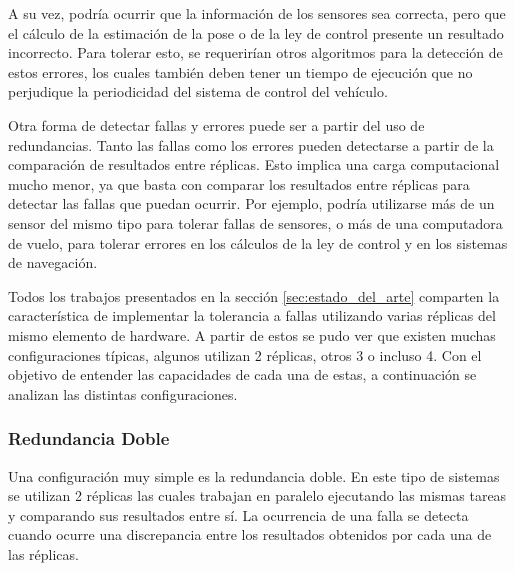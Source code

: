 A su vez, podría ocurrir que la información de los sensores sea correcta, pero que el cálculo de la estimación de la pose o de la ley de control presente un resultado incorrecto. Para tolerar esto, se requerirían otros algoritmos para la detección de estos errores, los cuales también deben tener un tiempo de ejecución que no perjudique la periodicidad del sistema de control del vehículo.

Otra forma de detectar fallas y errores puede ser a partir del uso de redundancias. %
Tanto las fallas como los errores pueden detectarse a partir de la comparación de resultados entre réplicas. Esto implica una carga computacional mucho menor, ya que basta con comparar los resultados entre réplicas para detectar las fallas que puedan ocurrir. 
Por ejemplo, podría utilizarse más de un sensor del mismo tipo para tolerar fallas de sensores, o más de una computadora de vuelo, para tolerar errores en los cálculos de la ley de control y en los sistemas de navegación.

Todos los trabajos presentados en la sección \ref{sec:estado_del_arte} comparten la característica de implementar la tolerancia a fallas utilizando varias réplicas del mismo elemento de hardware. A partir de estos se pudo ver que existen muchas configuraciones típicas, algunos utilizan 2 réplicas, otros 3 o incluso 4. Con el objetivo de entender las capacidades de cada una de estas, a continuación se analizan las distintas configuraciones.

\subsubsection{Redundancia Doble}

Una configuración muy simple es la redundancia doble. En este tipo de sistemas se utilizan 2 réplicas las cuales trabajan en paralelo ejecutando las mismas tareas y comparando sus resultados entre sí. La ocurrencia de una falla se detecta cuando ocurre una discrepancia entre los resultados obtenidos por cada una de las réplicas.

